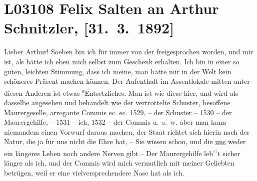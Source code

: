 

\section[Felix Salten an Arthur Schnitzler, {[}31. 3. 1892{]}]{L03108 Felix Salten an Arthur Schnitzler, {[}31. 3. 1892{]}}
\nopagebreak{}
\rehead{ }\normalsize\beginnumbering{}
\toendnotes[C]{\smallbreak\pagebreak[2]}
\toendnotes[C]{\smallbreak}
\pstart
           \noindent{}{\pb}Lieber Arthur! Soeben bin ich für immer von der
                  \label{K_L03108-1v}\label{K_L03108-1}
               freigesprochen worden, und mir ist, als hätte ich eben mich selbst zum Geschenk
               erhalten. Ich bin in einer so guten, leichten Stimmung, dass ich meine, man hätte mir
               in der Welt kein schöneres Präsent machen können. Der Aufenthalt {\pb}im Assentlokale mitten
               unter diesen Anderen ist etwas \substVorne{}\textsuperscript{e}\substDazwischen{}E\substHinten{}ntsetzliches. Man ist wie diese hier, und wird als
               dasselbe angesehen und behandelt wie der vertrottelte Schuster, besoffene
               Maurergeselle, arrogante Commis ec. ec. 1529, – der Schuster – 1530 – der
               Maurergehilfe, – 1531 – ich, 1532 – der Commis u. s. w. aber man kann niemandem einen
               Vorwurf daraus machen, der Staat richtet {\pb}sich hierin nach der
               Natur, die ja für uns nicht die Ehre hat, – Sie wissen schon, und die \uline{uns} weder ein längeres Leben noch andere Nerven
                  gibt\textcolor{gray}{.}– Der Maurergehilfe leb\substVorne{}\textsuperscript{\textcolor{gray}{st}}\substDazwischen{}t\substHinten{} sicher länger als ich, und der Commis wird mich vermutlich mit meiner
               Geliebten betrügen, weil er eine vielversprechendere Nase hat als ich.\pend
           
